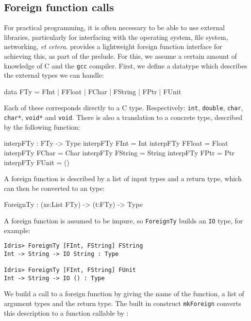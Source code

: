 \subsection{Foreign function calls}

For practical programming, it is often necessary to be able to use external libraries, particularly for interfacing with the operating system, file system, networking, \emph{et cetera}.
\Idris{} provides a lightweight foreign function interface for achieving this, as part of the prelude.
For this, we assume a certain amount of knowledge of C and the \texttt{gcc} compiler.
First, we define a datatype which describes the external types we can handle:

\begin{code}
data FTy = FInt | FFloat | FChar | FString | FPtr | FUnit
\end{code}

\noindent
Each of these corresponds directly to a C type.
Respectively: \texttt{int}, \texttt{double}, \texttt{char}, \texttt{char*}, \texttt{void*} and \texttt{void}.
There is also a translation to a concrete \Idris{} type, described by the following function:

\begin{code}
interpFTy : FTy -> Type
interpFTy FInt    = Int
interpFTy FFloat  = Float
interpFTy FChar   = Char
interpFTy FString = String
interpFTy FPtr    = Ptr
interpFTy FUnit   = ()
\end{code}

\noindent
A foreign function is described by a list of input types and a return type, which can then be converted to an \Idris{} type:

\begin{code}
ForeignTy : (xs:List FTy) -> (t:FTy) -> Type
\end{code}

\noindent
A foreign function is assumed to be impure, so \texttt{ForeignTy} builds an \texttt{IO} type, for example:

\begin{lstlisting}
Idris> ForeignTy [FInt, FString] FString
Int -> String -> IO String : Type

Idris> ForeignTy [FInt, FString] FUnit 
Int -> String -> IO () : Type
\end{lstlisting}

\noindent
We build a call to a foreign function by giving the name of the function, a list of argument types and the return type.
The built in construct \texttt{mkForeign} converts this description to a function callable by \Idris{}:


